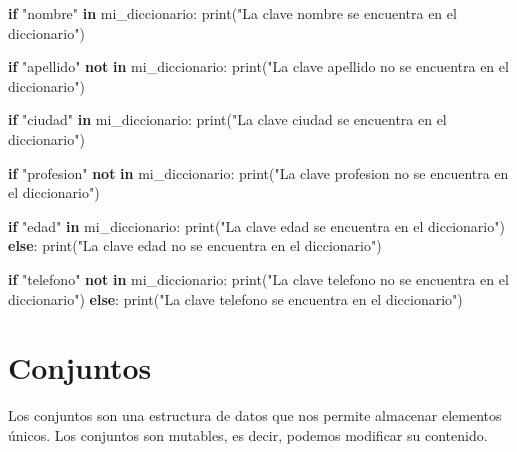 \documentclass[
  a4paper,
  DIV=11,
  numbers=noendperiod,
  onepage,
  openany]{scrreprt}
\newenvironment{Shaded}{\begin{snugshade}}{\end{snugshade}}
\newcommand{\BuiltInTok}[1]{\textcolor[rgb]{0.00,0.23,0.31}{#1}}
\newcommand{\ControlFlowTok}[1]{\textcolor[rgb]{0.00,0.23,0.31}{\textbf{#1}}}
\newcommand{\KeywordTok}[1]{\textcolor[rgb]{0.00,0.23,0.31}{\textbf{#1}}}
\newcommand{\NormalTok}[1]{\textcolor[rgb]{0.00,0.23,0.31}{#1}}
\newcommand{\StringTok}[1]{\textcolor[rgb]{0.13,0.47,0.30}{#1}}
\begin{document}
\begin{Shaded}
\begin{Highlighting}[]
\ControlFlowTok{if} \StringTok{"nombre"} \KeywordTok{in}\NormalTok{ mi\_diccionario:}
    \BuiltInTok{print}\NormalTok{(}\StringTok{"La clave \textquotesingle{}nombre\textquotesingle{} se encuentra en el diccionario"}\NormalTok{)}

\ControlFlowTok{if} \StringTok{"apellido"} \KeywordTok{not} \KeywordTok{in}\NormalTok{ mi\_diccionario:}
    \BuiltInTok{print}\NormalTok{(}\StringTok{"La clave \textquotesingle{}apellido\textquotesingle{} no se encuentra en el diccionario"}\NormalTok{)}

\ControlFlowTok{if} \StringTok{"ciudad"} \KeywordTok{in}\NormalTok{ mi\_diccionario:}
    \BuiltInTok{print}\NormalTok{(}\StringTok{"La clave \textquotesingle{}ciudad\textquotesingle{} se encuentra en el diccionario"}\NormalTok{)}

\ControlFlowTok{if} \StringTok{"profesion"} \KeywordTok{not} \KeywordTok{in}\NormalTok{ mi\_diccionario:}
    \BuiltInTok{print}\NormalTok{(}\StringTok{"La clave \textquotesingle{}profesion\textquotesingle{} no se encuentra en el diccionario"}\NormalTok{)}

\ControlFlowTok{if} \StringTok{"edad"} \KeywordTok{in}\NormalTok{ mi\_diccionario:}
    \BuiltInTok{print}\NormalTok{(}\StringTok{"La clave \textquotesingle{}edad\textquotesingle{} se encuentra en el diccionario"}\NormalTok{)}
\ControlFlowTok{else}\NormalTok{:}
    \BuiltInTok{print}\NormalTok{(}\StringTok{"La clave \textquotesingle{}edad\textquotesingle{} no se encuentra en el diccionario"}\NormalTok{)}

\ControlFlowTok{if} \StringTok{"telefono"} \KeywordTok{not} \KeywordTok{in}\NormalTok{ mi\_diccionario:}
    \BuiltInTok{print}\NormalTok{(}\StringTok{"La clave \textquotesingle{}telefono\textquotesingle{} no se encuentra en el diccionario"}\NormalTok{)}
\ControlFlowTok{else}\NormalTok{:}
    \BuiltInTok{print}\NormalTok{(}\StringTok{"La clave \textquotesingle{}telefono\textquotesingle{} se encuentra en el diccionario"}\NormalTok{)}
\end{Highlighting}
\end{Shaded}

\chapter{Conjuntos}\label{conjuntos}

Los conjuntos son una estructura de datos que nos permite almacenar
elementos únicos. Los conjuntos son mutables, es decir, podemos
modificar su contenido.
\end{document}
